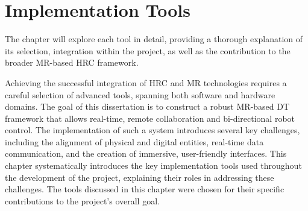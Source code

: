 











\chapter{Implementation Tools}%
\label{chapter:tools}



The chapter will explore each tool in detail, providing a thorough explanation of its selection, integration within the project, as well as the contribution to the broader \ac{MR}-based \ac{HRC} framework.


Achieving the successful integration of \ac{HRC} and \ac{MR} technologies requires a careful selection of advanced tools, spanning both software and hardware domains. The goal of this dissertation is to construct a robust \ac{MR}-based \ac{DT} framework that allows real-time, remote collaboration and bi-directional robot control. The implementation of such a system introduces several key challenges, including the alignment of physical and digital entities, real-time data communication, and the creation of immersive, user-friendly interfaces. This chapter systematically introduces the key implementation tools used throughout the development of the project, explaining their roles in addressing these challenges. 
The tools discussed in this chapter were chosen for their specific contributions to the project’s overall goal. 

